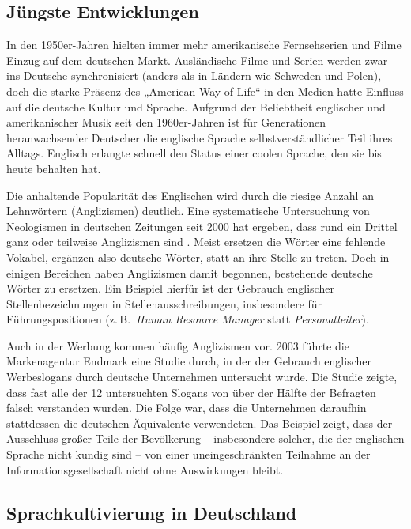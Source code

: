 \begin{multicols}{2}
\subsection{Jüngste Entwicklungen}

In den 1950er-Jahren hielten immer mehr amerikanische Fernsehserien und Filme Einzug auf dem deutschen Markt. Ausländische Filme und Serien werden zwar ins Deutsche synchronisiert (anders als in Ländern wie Schweden und Polen), doch die starke Präsenz des „American Way of Life“ in den Medien hatte Einfluss auf die deutsche Kultur und Sprache. Aufgrund der Beliebtheit englischer und amerikanischer Musik seit den 1960er-Jahren ist für Generationen heranwachsender Deutscher die englische Sprache selbstverständlicher Teil ihres Alltags. Englisch erlangte schnell den Status einer coolen Sprache, den sie bis heute behalten hat. 

Die anhaltende Popularität des Englischen wird durch die riesige Anzahl an Lehnwörtern (Anglizismen) deutlich. Eine systematische Untersuchung von Neologismen in deutschen Zeitungen seit 2000 hat ergeben, dass rund ein Drittel ganz oder teilweise Anglizismen sind \cite{Lemni1}. Meist ersetzen die Wörter eine fehlende Vokabel, ergänzen also deutsche Wörter, statt an ihre Stelle zu treten. Doch in einigen Bereichen haben Anglizismen damit begonnen, bestehende deutsche Wörter zu ersetzen. Ein Beispiel hierfür ist der Gebrauch englischer Stellenbezeichnungen in Stellenausschreibungen, insbesondere für Führungspositionen (z.\,B.~\textit{Human Resource Manager} statt \textit{Personalleiter}). 

Auch in der Werbung kommen häufig Anglizismen vor. 2003 führte die Markenagentur Endmark eine Studie durch, in der der Gebrauch englischer Werbeslogans durch deutsche Unternehmen untersucht wurde. Die Studie zeigte, dass fast alle der 12 untersuchten Slogans von über der Hälfte der Befragten falsch verstanden wurden. Die Folge war, dass die Unternehmen daraufhin stattdessen die deutschen Äquivalente verwendeten. Das Beispiel zeigt, dass der Ausschluss großer Teile der Bevölkerung -- insbesondere solcher, die der englischen Sprache nicht kundig sind -- von einer uneingeschränkten Teilnahme an der Informationsgesellschaft nicht ohne Auswirkungen bleibt.

\subsection{Sprachkultivierung in Deutschland}


\end{multicols}
